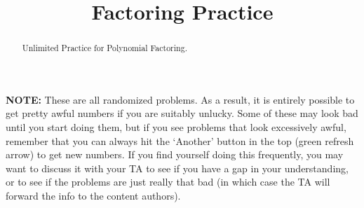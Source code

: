 \documentclass{ximeraXloud}
\title{Factoring Practice}
\begin{document}
\begin{abstract}
    Unlimited Practice for Polynomial Factoring.
\end{abstract}
\maketitle

\textbf{NOTE:} These are all randomized problems. As a result, it is entirely possible to get pretty awful numbers if you are suitably unlucky. Some of these may look bad until you start doing them, but if you see problems that look excessively awful, remember that you can always hit the `Another' button in the top (green refresh arrow) to get new numbers. If you find yourself doing this frequently, you may want to discuss it with your TA to see if you have a gap in your understanding, or to see if the problems are just really that bad (in which case the TA will forward the info to the content authors).

%
\end{document}
